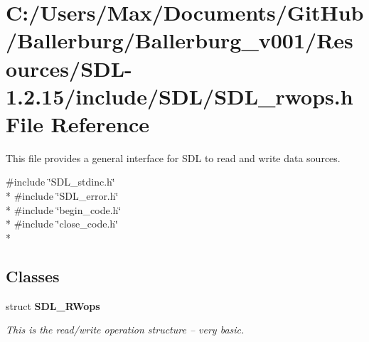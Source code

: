 \section{C\+:/\+Users/\+Max/\+Documents/\+Git\+Hub/\+Ballerburg/\+Ballerburg\+\_\+v001/\+Resources/\+S\+D\+L-\/1.2.15/include/\+S\+D\+L/\+S\+D\+L\+\_\+rwops.h File Reference}
\label{_s_d_l__rwops_8h}


This file provides a general interface for S\+D\+L to read and write data sources.  


{\ttfamily \#include \char`\"{}S\+D\+L\+\_\+stdinc.\+h\char`\"{}}\\*
{\ttfamily \#include \char`\"{}S\+D\+L\+\_\+error.\+h\char`\"{}}\\*
{\ttfamily \#include \char`\"{}begin\+\_\+code.\+h\char`\"{}}\\*
{\ttfamily \#include \char`\"{}close\+\_\+code.\+h\char`\"{}}\\*
\subsection*{Classes}
\begin{DoxyCompactItemize}
\item 
struct {\bf S\+D\+L\+\_\+\+R\+Wops}
\begin{DoxyCompactList}\small\item\em This is the read/write operation structure -- very basic. \end{DoxyCompactList}\end{DoxyCompactItemize}
